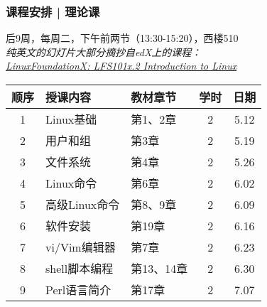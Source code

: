 \begin{frame}
  \frametitle{课程安排 | 理论课}
  \begin{center}
  \alert{后9周，每周二，下午前两节（13:30-15:20），西楼510}\\
  \vspace{0.2cm}
  {\footnotesize
  \textit{纯英文的幻灯片大部分摘抄自edX上的课程：\\ \href{https://www.edx.org/course/introduction-linux-linuxfoundationx-lfs101x-2}{LinuxFoundationX: LFS101x.2 Introduction to Linux}}
  }
  \end{center}
  \vspace{-0.5cm}
  \begin{table}
    \centering
    \begin{tabular}{cllcc}
      \hline
      \rowcolor{blue!50}顺序 & 授课内容 & 教材章节 & 学时 & 日期\\
      \hline
      1 & Linux基础 & 第1、2章 & 2 & 5.12\\
      2 & 用户和组 & 第3章 & 2 & 5.19\\
      3 & 文件系统 & 第4章 & 2 & 5.26\\
      4 & Linux命令 & 第6章 & 2 & 6.02\\
      5 & 高级Linux命令 & 第8、9章 & 2 & 6.09\\
      6 & 软件安装 & 第19章 & 2 & 6.16\\
      7 & vi/Vim编辑器 & 第7章 & 2 & 6.23\\
      8 & shell脚本编程 & 第13、14章 & 2 & 6.30\\
      9 & Perl语言简介 & 第17章 & 2 & 7.07\\
      \hline
    \end{tabular}
  \end{table}
\end{frame}

